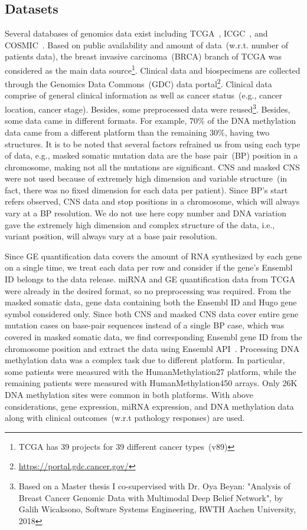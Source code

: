 \subsection{Datasets}
\label{dc}
Several databases of genomics data exist including TCGA~\cite{tcga}, ICGC~\cite{icgc}, and COSMIC~\cite{forbes}. Based on public availability and amount of data~(w.r.t. number of patients data), the breast invasive carcinoma~(BRCA) branch of TCGA was considered as the main data source\footnote{TCGA has 39 projects for 39 different cancer types~(v89)}. Clinical data and biospecimens are collected through the Genomics Data Commons~(GDC) data portal\footnote{\url{https://portal.gdc.cancer.gov/}}. Clinical data comprise of general clinical information as well as cancer status~(e.g., cancer location, cancer stage).
Besides, some preprocessed data were reused\footnote{Based on a Master thesis I co-supervised with Dr. Oya Beyan: "Analysis of Breast Cancer Genomic Data with Multimodal Deep Belief Network", by Galih Wicaksono, Software Systems Engineering, RWTH Aachen University, 2018}. Besides, some data came in different formats. For example, $70\%$ of the DNA methylation data came from a different platform than the remaining $30\%$, having two structures. It is to be noted that several factors refrained us from using each type of data, e.g., masked somatic mutation data are the base pair~(BP) position in a chromosome, making not all the mutations are significant. CNS and masked CNS were not used because of extremely high dimension and variable structure~(in fact, there was no fixed dimension for each data per patient). Since BP's start refers observed, CNS data and stop positions in a chromosome, which will always vary at a BP resolution. We do not use here copy number and DNA variation gave the extremely high dimension and complex structure of the data, i.e., variant position, will always vary at a base pair resolution.

\hspace*{3.5mm} Since GE quantification data covers the amount of RNA synthesized by each gene on a single time, we treat each data per row and consider if the gene's Ensembl ID belongs to the data release. miRNA and GE quantification data from TCGA were already in the desired format, so no preprocessing was required. From the masked somatic data, gene data containing both the Ensembl ID and Hugo gene symbol considered only. Since both CNS and masked CNS data cover entire gene mutation cases on base-pair sequences instead of a single BP case, which was covered in masked somatic data, we find corresponding Ensembl gene ID from the chromosome position and extract the data using Ensembl API~\cite{yates}. 
Processing DNA methylation data was a complex task due to different platform. In particular, some patients were measured with the HumanMethylation27 platform, while the remaining patients were measured with HumanMethylation450 arrays. Only 26K DNA methylation sites were common in both platforms. With above considerations, gene expression, miRNA expression, and DNA methylation data along with clinical outcomes~(w.r.t pathology responses) are used. 

